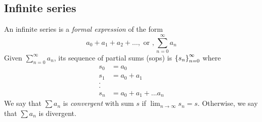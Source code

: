 \documentclass[12pt]{article}
\begin{document}
\subsection{Infinite series}

\begin{defn} \label{defn:infinite series}
    An infinite series is a \emph{formal expression} of the form \[
        a_{0} + a_{1} + a_{2} + \dots, \text{ or }, \sum_{n=0}^{\infty} a_{n}
    \]
    Given $\sum_{n=0}^{\infty} a_{n}$, its sequence of partial sums (sops) is $\set{s_{n}}_{n=0}^{\infty}$ where
    \begin{align*}
        s_{0} &= a_{0} \\
        s_{1} &= a_{0} + a_{1} \\
        .\\
        .\\
        s_{n} &= a_{0} + a_{1} + \dots a_{n}
    \end{align*}
    We say that $\sum a_{n}$ is \emph{convergent} with sum $s$ if $\lim_{n \to \infty} s_{n} = s$. Otherwise, we say that $\sum a_{n}$ is divergent.
\end{defn}
\end{document}
